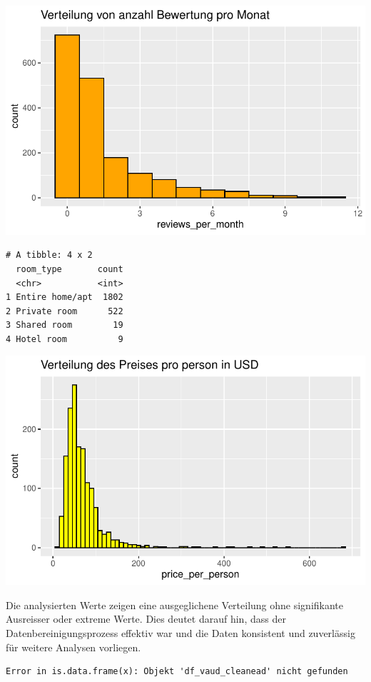 \documentclass[
  journal,
]{IEEEtran}%
\begin{document}
\includegraphics{main_files/figure-pdf/eda-3.pdf}

\begin{verbatim}
# A tibble: 4 x 2
  room_type       count
  <chr>           <int>
1 Entire home/apt  1802
2 Private room      522
3 Shared room        19
4 Hotel room          9
\end{verbatim}

\includegraphics{main_files/figure-pdf/eda price_per_person-1.pdf}

Die analysierten Werte zeigen eine ausgeglichene Verteilung ohne
signifikante Ausreisser oder extreme Werte. Dies deutet darauf hin, dass
der Datenbereinigungsprozess effektiv war und die Daten konsistent und
zuverlässig für weitere Analysen vorliegen.

\begin{verbatim}
Error in is.data.frame(x): Objekt 'df_vaud_cleanead' nicht gefunden
\end{verbatim}
\end{document}
